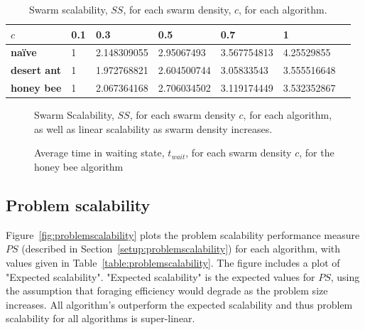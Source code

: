\begin{table}[]
\centering
\caption{Swarm scalability, $SS$, for each swarm density, $c$, for each algorithm.}
\label{table:swarmscalability}
\begin{tabular}{@{}lllllll@{}}
\toprule
\textbf{$c$}            & \textbf{0.1} & \textbf{0.3}         & \textbf{0.5}         & \textbf{0.7}         & \textbf{1}           \\ \midrule
\textbf{na\"ive}    & 1   & 2.148309055 & 2.95067493  & 3.567754813 & 4.25529855  \\
\textbf{desert ant} & 1   & 1.972768821 & 2.604500744 & 3.05833543  & 3.555516648 \\
\textbf{honey bee}  & 1   & 2.067364168 & 2.706034502 & 3.119174449 & 3.532352867 \\ \bottomrule
\end{tabular}
\end{table}

\begin{figure}[!htb]
\centering
\small
\resizebox{\textwidth}{!}{}
\caption{Swarm Scalability, $SS$, for each swarm density $c$, for each algorithm, as well as linear scalability as swarm density increases.}
\label{fig:swarmscalability}
\end{figure}

\begin{figure}[!htb]
\centering
\small
\resizebox{\textwidth}{!}{}
\caption{Average time in waiting state, $t_{wait}$, for each swarm density $c$, for the honey bee algorithm}
\label{fig:swarmscalabilitywaitingtime}
\end{figure}


\subsection{Problem scalability}
\label{results:problemscalability}

Figure~\ref{fig:problemscalability} plots the problem scalability performance measure $PS$ (described in Section~\ref{setup:problemscalability}) for each algorithm, with values given in Table~\ref{table:problemscalability}. The figure includes a plot of "Expected scalability". "Expected scalability" is the expected values for $PS$, using the assumption that foraging efficiency would degrade as the problem size increases. All algorithm's outperform the expected scalability and thus problem scalability for all algorithms is super-linear.

